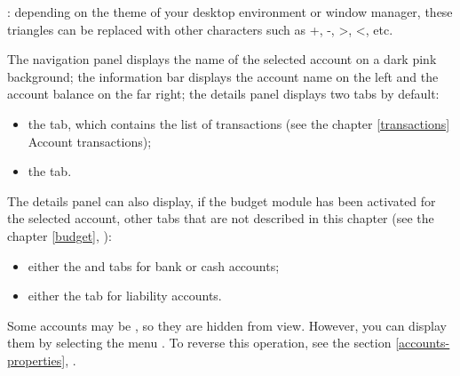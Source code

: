 \Note{}: depending on the theme of your desktop environment or window manager, these triangles can be replaced with other characters such as +, -, >, <, etc.

The navigation panel displays the name of the selected account on a \colorbox[RGB]{235,149,149}{dark pink background}; the information bar displays the account name on the left and the account balance on the far right; the details panel displays two tabs by default:
\begin{itemize}
	\item the  tab, which contains the list of transactions (see the chapter \vref{transactions} Account transactions);
	\item the  tab.
\end{itemize}

The details panel can also display, if the budget module has been activated for the selected account, other tabs that are not described in this chapter (see the chapter \vref{budget}, ):
\begin{itemize}
	\item either the  and  tabs for bank or cash accounts;
	\item either the  tab for liability accounts.
\end{itemize}

Some accounts may be , so they are hidden from view. However, you can display them by selecting the menu . To reverse this operation, see the section \vref{accounts-properties}, .



